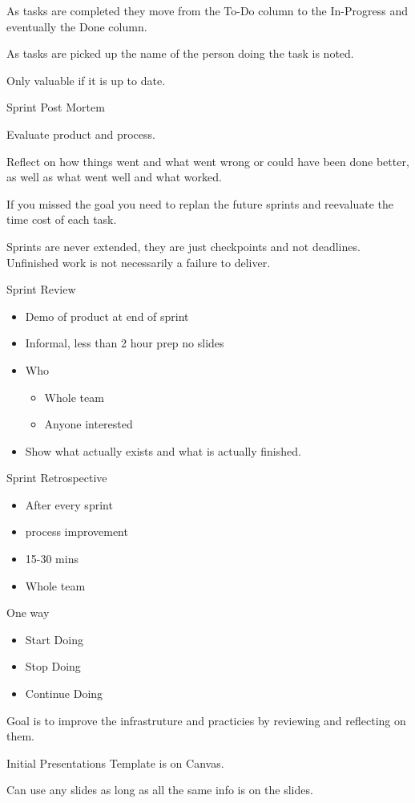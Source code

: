 \documentclass{report}
\begin{document}
\begin{description}
        As tasks are completed they move from the To-Do column
        to the In-Progress and eventually the Done column.

        As tasks are picked up the name of the person doing
        the task is noted.

        Only valuable if it is up to date.

    \item Sprint Post Mortem

        Evaluate product and process.

        Reflect on how things went and what went wrong
        or could have been done better, as well as what
        went well and what worked.

        If you missed the goal you need to replan the future
        sprints and reevaluate the time cost of each task.

        Sprints are never extended, they are just checkpoints
        and not deadlines. Unfinished work is not necessarily
        a failure to deliver.

    \item Sprint Review
        \begin{itemize}
            \item Demo of product at end of sprint
            \item Informal, less than 2 hour prep no slides
            \item Who
                \begin{itemize}
                    \item Whole team
                    \item Anyone interested
                \end{itemize}
            \item Show what actually exists and what is
                actually finished.
        \end{itemize}

    \item Sprint Retrospective
        \begin{itemize}
            \item After every sprint
            \item process improvement
            \item 15-30 mins
            \item Whole team
        \end{itemize}

        One way
        \begin{itemize}
            \item Start Doing
            \item Stop Doing
            \item Continue Doing
        \end{itemize}

        Goal is to improve the infrastruture and practicies
        by reviewing and reflecting on them.


    \item Initial Presentations
        Template is on Canvas.

        Can use any slides as long as all the same
        info is on the slides.
\end{description}
\end{document}
